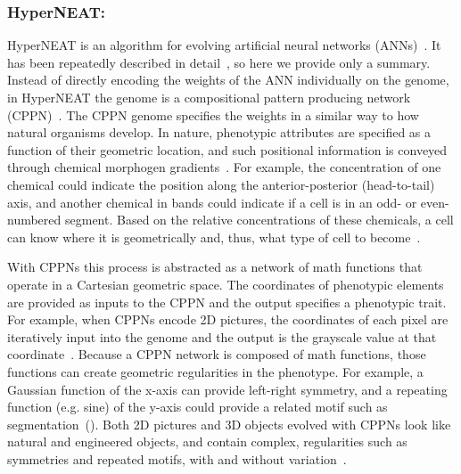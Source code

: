 
\subsubsection{HyperNEAT:}

HyperNEAT is an algorithm for evolving artificial neural networks (ANNs)~\cite{stanley2009hypercube}. It has been repeatedly described in detail~\cite{stanley2009hypercube,gauci2007generating,clune2011performance},  so here we provide only a summary. Instead of directly encoding the weights of the ANN individually on the genome, in HyperNEAT the genome is a compositional pattern producing network (CPPN)~\cite{stanley2007CPPN}. The CPPN genome specifies the weights in a similar way to how natural organisms develop. In nature, phenotypic attributes are specified as a function of their geometric location, and such positional information is conveyed through chemical morphogen gradients~\cite{carroll2005endless}. For example, the concentration of one chemical could indicate the position along the anterior-posterior (head-to-tail) axis, and another chemical in bands could indicate if a cell is in an odd- or even-numbered segment. Based on the relative concentrations of these chemicals, a cell can know where it is geometrically and, thus, what type of cell to become~\cite{carroll2005endless}. 

With CPPNs this process is abstracted as a network of math functions that operate in a Cartesian geometric space. The coordinates of phenotypic elements are provided as inputs to the CPPN and the output specifies a phenotypic trait. For example, when CPPNs encode 2D pictures, the coordinates of each pixel are iteratively input into the genome and the output is the grayscale value at that coordinate~\cite{secretan2011picbreeder}. Because a CPPN network is composed of math functions, those functions can create geometric regularities in the phenotype. For example, a Gaussian function of the x-axis can provide left-right symmetry, and a repeating function (e.g. sine) of the y-axis could provide a related motif such as segmentation~(). Both 2D pictures and 3D objects evolved with CPPNs look like natural and engineered objects, and contain complex, regularities such as symmetries and repeated motifs, with and without variation~\cite{secretan2011picbreeder,clune2011objects}. 



